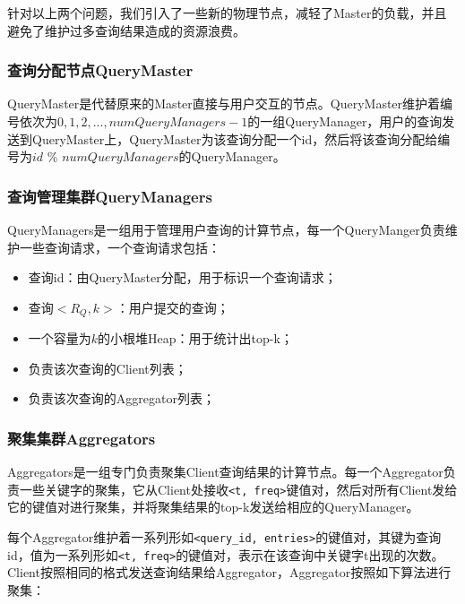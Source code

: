 \documentclass{elegantpaper}
\begin{document}
\noindent 针对以上两个问题，我们引入了一些新的物理节点，减轻了Master的负载，并且避免了维护过多查询结果造成的资源浪费。

\subsubsection{查询分配节点QueryMaster}

QueryMaster是代替原来的Master直接与用户交互的节点。QueryMaster维护着编号依次为$0, 1, 2, ..., numQueryManagers - 1$的一组QueryManager，用户的查询发送到QueryMaster上，QueryMaster为该查询分配一个id，然后将该查询分配给编号为$id$ \% $numQueryManagers$的QueryManager。

\subsubsection{查询管理集群QueryManagers}

QueryManagers是一组用于管理用户查询的计算节点，每一个QueryManger负责维护一些查询请求，一个查询请求包括：

\begin{itemize}

    \item 查询id：由QueryMaster分配，用于标识一个查询请求；
    
    \item 查询$<R_Q, k>$：用户提交的查询；
    
    \item 一个容量为$k$的小根堆Heap：用于统计出top-k；
    
    \item 负责该次查询的Client列表；
    
    \item 负责该次查询的Aggregator列表；
    
\end{itemize}

\subsubsection{聚集集群Aggregators}

Aggregators是一组专门负责聚集Client查询结果的计算节点。每一个Aggregator负责一些关键字的聚集，它从Client处接收\verb|<t, freq>|键值对，然后对所有Client发给它的键值对进行聚集，并将聚集结果的top-k发送给相应的QueryManager。

\noindent 每个Aggregator维护着一系列形如\verb|<query_id, entries>|的键值对，其键为查询id，值为一系列形如\verb|<t, freq>|的键值对，表示在该查询中关键字t出现的次数。Client按照相同的格式发送查询结果给Aggregator，Aggregator按照如下算法进行聚集：
\end{document}
